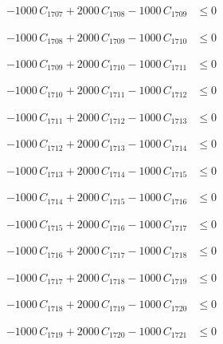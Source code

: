 \documentclass[a4paper,11pt]{article}
\begin{document}
\begin{align}
-1000\,C_{1707} + 2000\,C_{1708} - 1000\,C_{1709} &\leq 0 \nonumber
\end{align}

\begin{align}
-1000\,C_{1708} + 2000\,C_{1709} - 1000\,C_{1710} &\leq 0 \nonumber
\end{align}

\begin{align}
-1000\,C_{1709} + 2000\,C_{1710} - 1000\,C_{1711} &\leq 0 \nonumber
\end{align}

\begin{align}
-1000\,C_{1710} + 2000\,C_{1711} - 1000\,C_{1712} &\leq 0 \nonumber
\end{align}

\begin{align}
-1000\,C_{1711} + 2000\,C_{1712} - 1000\,C_{1713} &\leq 0 \nonumber
\end{align}

\begin{align}
-1000\,C_{1712} + 2000\,C_{1713} - 1000\,C_{1714} &\leq 0 \nonumber
\end{align}

\begin{align}
-1000\,C_{1713} + 2000\,C_{1714} - 1000\,C_{1715} &\leq 0 \nonumber
\end{align}

\begin{align}
-1000\,C_{1714} + 2000\,C_{1715} - 1000\,C_{1716} &\leq 0 \nonumber
\end{align}

\begin{align}
-1000\,C_{1715} + 2000\,C_{1716} - 1000\,C_{1717} &\leq 0 \nonumber
\end{align}

\begin{align}
-1000\,C_{1716} + 2000\,C_{1717} - 1000\,C_{1718} &\leq 0 \nonumber
\end{align}

\begin{align}
-1000\,C_{1717} + 2000\,C_{1718} - 1000\,C_{1719} &\leq 0 \nonumber
\end{align}

\begin{align}
-1000\,C_{1718} + 2000\,C_{1719} - 1000\,C_{1720} &\leq 0 \nonumber
\end{align}

\begin{align}
-1000\,C_{1719} + 2000\,C_{1720} - 1000\,C_{1721} &\leq 0 \nonumber
\end{align}
\end{document}
